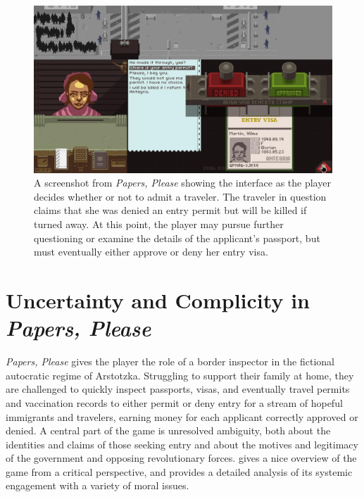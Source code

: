 \documentclass[arts,article,submit,moreauthors,pdftex,10pt,a4paper]{Definitions/mdpi}
\begin{document}
\begin{figure}[t]
  \includegraphics[width=\textwidth]{fig/papers-please-visa-choice.png}
  \caption{A screenshot from \emph{Papers, Please} showing the interface as the player decides whether or not to admit a traveler. The traveler in question claims that she was denied an entry permit but will be killed if turned away. At this point, the player may pursue further questioning or examine the details of the applicant's passport, but must eventually either approve or deny her entry visa.}
  \label{fig:PP_visa}
\end{figure}



\section{Uncertainty and Complicity in \emph{Papers, Please}}

\emph{Papers, Please} \citep{pope2013papers} gives the player the role of a border inspector in the fictional autocratic regime of Arstotzka.
%
Struggling to support their family at home, they are challenged to quickly inspect passports, visas, and eventually travel permits and vaccination records to either permit or deny entry for a stream of hopeful immigrants and travelers, earning money for each applicant correctly approved or denied.
%
A central part of the game is unresolved ambiguity, both about the identities and claims of those seeking entry and about the motives and legitimacy of the government and opposing revolutionary forces.
%
\cite{alexander2013designing} gives a nice overview of the game from a critical perspective, and \cite{formosa2016papers} provides a detailed analysis of its systemic engagement with a variety of moral issues.
\end{document}
